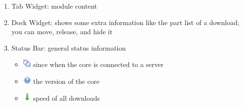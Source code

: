 \documentclass[a4paper,10pt]{book}
\begin{document}
\begin{enumerate}
\begin{itemize}
  \item {} 
  \item {} 
  \item {} 
  \item {} 
  \item {} 
  \item {} 
 \end{itemize}
 \item Tab Widget: module content
 \item Dock Widget: shows some extra information like the part list of a download; you can move, release, and hide it
 \item Status Bar: general status information
 \begin{itemize}
  \item \includegraphics[width=16px]{../small/connect_established.png} since when the core is connected to a server
  \item \includegraphics[width=16px]{../small/help.png} the version of the core
  \item \includegraphics[width=16px]{../small/arrow_down.png} speed of all downloads

\end{itemize}
\end{enumerate}
\end{document}
